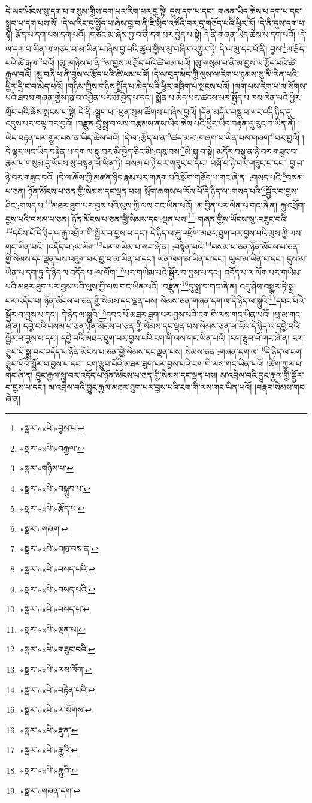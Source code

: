 དེ་ཡང་ཡོངས་སུ་དག་པ་གསུམ་གྱིས་དག་པར་རིག་པར་བྱ་སྟེ། དུས་དག་པ་དང་། གཞན་ཡིད་ཆེས་པ་དག་པ་དང་། སྒྲུབ་པ་དག་པས་སོ། །དེ་ལ་རིང་དུ་སྤྱོད་པ་ཞེས་བྱ་བ་ནི་ཇི་སྲིད་འཚོའི་བར་དུ་གཅོད་པའི་ཕྱིར་རོ། །དེ་ནི་དུས་དག་པ་སྟེ། རྩོད་པ་དག་པས་དག་པའོ། །གཙང་མ་ཞེས་བྱ་བ་ནི་དག་པར་བྱེད་པ་སྟེ། དེ་ནི་གཞན་ཡིད་ཆེས་པ་དག་པའོ། །དེ་ལ་དག་པ་ཡིན་ལ་གཙང་བ་མ་ཡིན་པ་ཞེས་བྱ་བའི་ཚུལ་གྱིས་མུ་བཞིར་འགྱུར་ཏེ། དེ་ལ་མུ་དང་པོ་ནི། བྱས་\footnote{«སྣར་»«པེ་»བྱས་པ་}ལ་རྩོད་པའི་ཚེ་རྒྱལ་\footnote{«སྣར་»«པེ་»བརྒྱལ་}བའོ། །མུ་:གཉིས་པ་ནི་\footnote{«སྣར་»གཉིས་པ་}མ་བྱས་ལ་རྩོད་པའི་ཚེ་ཕམ་པའོ། །མུ་གསུམ་པ་ནི་མ་བྱས་ལ་རྩོད་པའི་ཚེ་རྒྱལ་བའོ། །མུ་བཞི་པ་ནི་བྱས་ལ་རྩོད་པའི་ཚེ་ཕམ་པའོ། །དེ་ལ་བུད་མེད་ཀྱི་ལུས་ལ་རེག་པ་ཉམས་སུ་མི་ལེན་པའི་ཕྱིར་དྲི་ང་བ་མེད་པའོ། །གཉིས་ཀྱིས་གཉིས་སྤྲོད་པ་མེད་པའི་ཕྱིར་འཁྲིག་པ་སྤངས་པའོ། །ལག་པས་རེག་པ་ལ་སོགས་པའི་ཐབས་གཞན་གྱིས་ཁུ་བ་འབྱིན་པར་མི་བྱེད་པ་དང་། སྨོན་པ་མེད་པར་ཚངས་པར་སྤྱོད་པ་ཁས་ལེན་པའི་ཕྱིར་གྲོང་པའི་ཆོས་སྤངས་པ་སྟེ། དེ་ནི་:སྒྲུབ་པ་\footnote{«སྣར་»«པེ་»བསྒྲུབ་པ་}ཕུན་སུམ་ཚོགས་པ་ཞེས་བྱའོ། །དོན་མདོར་བསྡུ་བ་ཡང་འདི་ཉིད་དུ་འདུས་པར་བལྟ་བར་བྱའོ། །བརྫུན་དུ་སྨྲ་བ་ལས་བརྩམས་ནས་ཡིད་ཆེས་པའི་ཕྱིར་ཡིད་བརྟན་དུ་རུང་བ་ཡིན་ནོ། །ཡིད་བརྟན་པར་གྱུར་པས་ན་ཡིད་ཆེས་པའོ། །དེ་ལ་:རྩོད་པ་ན་\footnote{«སྣར་»«པེ་»རྩོད་པ་}ཚད་མར་:གཞག་པ་ཡིན་པས་གཞག་\footnote{«སྣར་»གཞག་}པར་བྱའོ། །དེ་ལྟར་ཡང་ཡིད་བརྟེན་པ་དག་ལ་སླུ་བར་མི་བྱེད་ཅིང་མི་:འཁུ་བས་\footnote{«སྣར་»«པེ་»འཁུ་བས་ན་}མི་སླུ་བ་སྟེ། མདོར་བསྡུ་ན་ཉེ་བར་གཟུང་བ་རྣམ་པ་གསུམ་དུ་ཡོངས་སུ་བསྟན་པ་ཡིན་ཏེ། བསམ་པ་ཉེ་བར་གཟུང་བ་དང་། བསྐོ་བ་ཉེ་བར་གཟུང་བ་དང་། བྱ་བ་ཉེ་བར་གཟུང་བའོ། །དེ་ལ་ཆོས་ཀྱི་མཚན་ཉིད་རྣམ་པར་གཞག་པའི་སྲོག་གཅོད་པ་གང་ཞེ་ན། :གསད་པའི་\footnote{«སྣར་»«པེ་»བསད་པའི་}བསམ་པ་ཅན། ཉོན་མོངས་པ་ཅན་གྱི་སེམས་དང་ལྡན་པས། སྲོག་ཆགས་ཕ་རོལ་པོ་དེ་ཉིད་ལ་:གསད་པའི་\footnote{«སྣར་»«པེ་»བསད་པའི་}སྦྱོར་བ་བྱས་ཤིང་:གསད་པ་\footnote{«སྣར་»«པེ་»བསད་པ་}མཐར་ཐུག་པར་བྱས་པའི་ལུས་ཀྱི་ལས་གང་ཡིན་པའོ། །མ་བྱིན་པར་ལེན་པ་གང་ཞེ་ན། རྐུ་འཕྲོག་བྱས་པའི་བསམ་པ་ཅན། ཉོན་མོངས་པ་ཅན་གྱི་སེམས་དང་:ལྡན་པས།\footnote{«སྣར་»«པེ་»ལྡན་པ།} གཞན་གྱིས་ཡོངས་སུ་:བཟུང་བའི་\footnote{«སྣར་»«པེ་»གཟུང་བའི་}དངོས་པོ་དེ་ཉིད་ལ་རྐུ་འཕྲོག་གི་སྦྱོར་བ་བྱས་པ་དང་། དེ་ཉིད་ལ་རྐུ་འཕྲོག་མཐར་ཐུག་པར་བྱས་པའི་ལུས་ཀྱི་ལས་གང་ཡིན་པའོ། །འདོད་པ་:ལ་ལོག་\footnote{«སྣར་»«པེ་»ལས་ལོག་}པར་གཡེམ་པ་གང་ཞེ་ན། :བསྟེན་པའི་\footnote{«སྣར་»«པེ་»བརྟེན་པའི་}བསམ་པ་ཅན་ཉོན་མོངས་པ་ཅན་གྱི་སེམས་དང་ལྡན་པས་འཇུག་པར་བྱ་བ་མ་ཡིན་པ་དང་། ཡན་ལག་མ་ཡིན་པ་དང་། ཡུལ་མ་ཡིན་པ་དང་། དུས་མ་ཡིན་པ་དག་ཏུ་དེ་ཉིད་ལ་འདོད་པ་:ལ་ལོག་\footnote{«སྣར་»«པེ་»ལ་སོགས་}པར་གཡེམ་པའི་སྦྱོར་བ་བྱས་པ་དང་། འདོད་པ་ལ་ལོག་པར་གཡེམ་པའི་མཐར་ཐུག་པར་བྱས་པའི་ལུས་ཀྱི་ལས་གང་ཡིན་པའོ། །བརྫུན་\footnote{«སྣར་»«པེ་»རྫུན་}དུ་སྨྲ་བ་གང་ཞེ་ན། འདུ་ཤེས་བསྒྱུར་ཏེ་སྨྲ་བར་འདོད་པ། ཉོན་མོངས་པ་ཅན་གྱི་སེམས་དང་ལྡན་པས། སེམས་ཅན་གཞན་དག་ལ་དེ་ཉིད་ལ་སྒྱུའི་\footnote{«སྣར་»«པེ་»རྒྱུའི་}དབང་པོའི་སྦྱོར་བ་བྱས་པ་དང་། དེ་ཉིད་ལ་སྒྱུའི་\footnote{«སྣར་»«པེ་»རྒྱུའི་}དབང་པོ་མཐར་ཐུག་པར་བྱས་པའི་ངག་གི་ལས་གང་ཡིན་པའོ། །ཕྲ་མ་གང་ཞེ་ན། དབྱེ་བའི་བསམ་པ་ཅན་ཉོན་མོངས་པ་ཅན་གྱི་སེམས་དང་ལྡན་པས་སེམས་ཅན་ཕ་རོལ་དེ་ཉིད་ལ་དབྱེ་བའི་སྦྱོར་བ་བྱས་པ་དང་། དབྱེ་བའི་མཐར་ཐུག་པར་བྱས་པའི་ངག་གི་ལས་གང་ཡིན་པའོ། །ངག་རྩུབ་པོ་གང་ཞེ་ན། ངག་རྩུབ་པོ་སྨྲ་བར་འདོད་པ་ཉོན་མོངས་པ་ཅན་གྱི་སེམས་དང་ལྡན་པས། སེམས་ཅན་:གཞན་དག་ལ་\footnote{«སྣར་»གཞན་དག་}དེ་ཉིད་ལ་ངག་རྩུབ་པོའི་སྦྱོར་བ་བྱས་པ་དང་། ངག་རྩུབ་པོའི་མཐར་ཐུག་པར་བྱས་པའི་ངག་གི་ལས་གང་ཡིན་པའོ། །ཚིག་ཀྱལ་པ་གང་ཞེ་ན། བྱུང་རྒྱལ་སྨྲ་བར་འདོད་པ་ཉོན་མོངས་པ་ཅན་གྱི་སེམས་དང་ལྡན་པས། མ་འབྲེལ་བའི་བྱུང་རྒྱལ་གྱི་སྦྱོར་བ་བྱས་པ་དང་། མ་འབྲེལ་བའི་བྱུང་རྒྱལ་མཐར་ཐུག་པར་བྱས་པའི་ངག་གི་ལས་གང་ཡིན་པའོ། །བརྣབ་སེམས་གང་ཞེ་ན། 